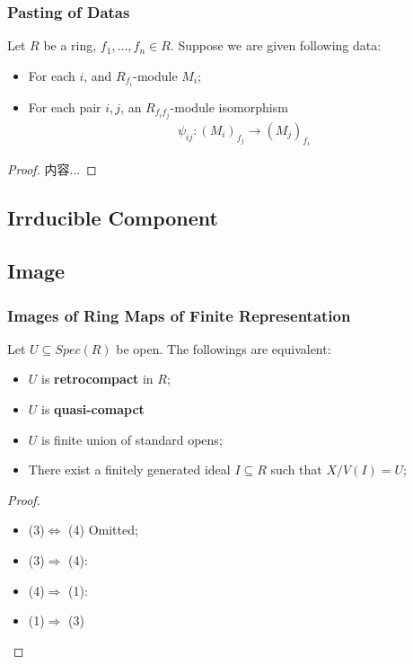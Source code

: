 \documentclass[Total.tex]{subfiles}
\begin{document}
			\subsubsection{Pasting of Datas}
			\begin{proposition}
				Let $R$ be a ring, $f_1,\dots,f_n\in R$. Suppose we are given following data:
				\begin{itemize}
					\item For each $i$, and $R_{f_i}$-module $M_i$;
					\item For each pair $i,j$, an $R_{f_if_j}$-module isomorphism
					\begin{gather*}
						\psi_{ij}:(M_i)_{f_j}\rightarrow (M_j)_{f_i}
					\end{gather*}
				\end{itemize}
			\end{proposition}
			\begin{proof}
				内容...
			\end{proof}
			\subsection{Irrducible Component}
			
			\subsection{Image}
				\subsubsection{Images of Ring Maps of Finite Representation}
				
					\begin{lemma}
						Let $U\subseteq Spec(R)$ be open. The followings are equivalent:
						
						\begin{itemize}
							\item $U$ is \textbf{retrocompact} in $R$;
							\item $U$ is \textbf{quasi-comapct}
							\item $U$ is finite union of standard opens;
							\item There exist a finitely generated ideal $I\subseteq R$ such that $X/V(I)=U$;
						\end{itemize}
					\end{lemma}
					
					\begin{proof}
						\begin{itemize}
							\item (3)$\Leftrightarrow$ (4) Omitted;
							\item (3)$\Rightarrow$ (4): 
							\item (4)$\Rightarrow$ (1):
							\item (1)$\Rightarrow$ (3)
						\end{itemize}
					\end{proof}
				
\end{document}

